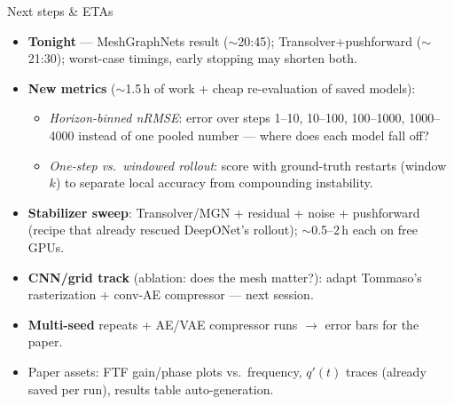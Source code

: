 \documentclass[10pt]{beamer}
\begin{document}
\begin{frame}{Next steps \& ETAs}
  \begin{itemize}
    \item \textbf{Tonight} --- MeshGraphNets result ($\sim$20:45); Transolver+pushforward
          ($\sim$21:30); worst-case timings, early stopping may shorten both.
    \item \textbf{New metrics} ($\sim$1.5\,h of work + cheap re-evaluation of saved models):
      \begin{itemize}
        \item \emph{Horizon-binned nRMSE}: error over steps 1--10, 10--100, 100--1000,
              1000--4000 instead of one pooled number --- where does each model fall off?
        \item \emph{One-step vs.\ windowed rollout}: score with ground-truth restarts
              (window $k$) to separate local accuracy from compounding instability.
      \end{itemize}
    \item \textbf{Stabilizer sweep}: Transolver/MGN + residual + noise + pushforward
          (recipe that already rescued DeepONet's rollout); $\sim$0.5--2\,h each on free GPUs.
    \item \textbf{CNN/grid track} (ablation: does the mesh matter?): adapt Tommaso's
          rasterization + conv-AE compressor --- next session.
    \item \textbf{Multi-seed} repeats + AE/VAE compressor runs $\to$ error bars for the paper.
    \item Paper assets: FTF gain/phase plots vs.\ frequency, $q'(t)$ traces
          (already saved per run), results table auto-generation.
  \end{itemize}
\end{frame}
\end{document}
